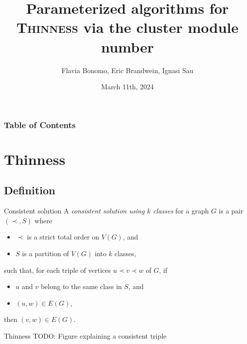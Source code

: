 \documentclass{beamer}
\title[Param. algorithms for \text{Thinness} via the cluster module number]{Parameterized algorithms for \textsc{Thinness} via the cluster module number}
\author{Flavia Bonomo, Eric Brandwein, Ignasi Sau}
\institute{Group: Graph Theory and Combinatorial Optimization}
\date{March 11th, 2024}
\begin{document}

\frame{\titlepage}


\begin{frame}
    \frametitle{Table of Contents}
    \tableofcontents[hideallsubsections]
\end{frame}

\section{Thinness}
\subsection{Definition}
\begin{frame}{Consistent solution}
    A \emph{consistent solution using $k$ classes} for a graph $G$ is a pair $(\prec, S)$ where 
    \begin{itemize}
        \item $\prec$ is a strict total order on $V(G)$, and 
        \item $S$ is a partition of $V(G)$ into $k$ classes,
    \end{itemize}
    such that, for each triple of vertices $u\prec v \prec w$ of $G$, if
    \begin{itemize}
        \item $u$ and $v$ belong to the same class in $S$, and
        \item $(u,w) \in E(G)$,
    \end{itemize}
    then $(v,w) \in E(G)$.
\end{frame}

\begin{frame}{Thinness}
    TODO: Figure explaining a consistent triple
\end{frame}
\end{document}
